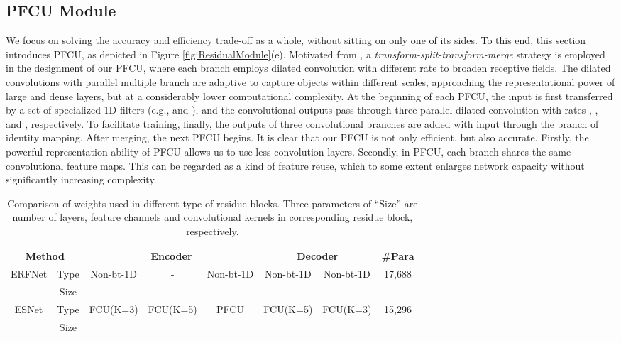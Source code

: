 \documentclass[runningheads]{llncs}
\begin{document}
\subsection{PFCU Module}\label{sec:PFCU}

We focus on solving the accuracy and efficiency trade-off as a whole, without sitting on only one of its sides. To this end, this section introduces PFCU, as depicted in  Figure \ref{fig:ResidualModule}(e). Motivated from \cite{Rastegari2016xnor,Szegedy2016rethinking}, a \emph{transform-split-transform-merge} strategy is employed in the designment of our PFCU, where each branch employs dilated convolution with different rate to broaden receptive fields. The dilated convolutions with parallel multiple branch are adaptive to capture objects within different scales, approaching the representational power of large and dense layers, but at a considerably lower computational complexity. At the beginning of each PFCU, the input is first transferred by a set of specialized 1D filters (e.g.,  and ), and the convolutional outputs pass through three parallel dilated convolution with rates , , and , respectively. To facilitate training, finally, the outputs of three convolutional branches are added with input through the branch of identity mapping. After merging, the next PFCU begins. It is clear that our PFCU is not only efficient, but also accurate. Firstly, the powerful representation ability of PFCU allows us to use less convolution layers. Secondly, in PFCU, each branch shares the same convolutional feature maps. This can be regarded as a kind of feature reuse, which to some extent enlarges network capacity without significantly increasing complexity.

\begin{table}[!t]
\tabcolsep 0.3mm \caption{Comparison of weights used in different type of residue blocks. Three parameters of ``Size'' are number of layers, feature channels and convolutional kernels in corresponding residue block, respectively.}
\begin{center}
\begin{tabular}{|c|c||c|c|c|c|c|c|}
\hline
\multicolumn{2}{|c||}{Method}     & \multicolumn{3}{c|}{Encoder}     & \multicolumn{2}{c|}{Decoder} & \#Para                 \\ \hline \hline
\multirow{2}{*}{ERFNet\cite{Romera2018erfnet}} & Type   & Non-bt-1D & -        & Non-bt-1D & Non-bt-1D     & Non-bt-1D    & \multirow{2}{*}{17,688} \\ \cline{2-7}
                        & Size &    & -        &   &        &       &                        \\ \hline
\multirow{2}{*}{ESNet}   & Type   & FCU(K=3)  & FCU(K=5) & PFCU      & FCU(K=5)      & FCU(K=3)     & \multirow{2}{*}{15,296} \\ \cline{2-7}
                        & Size &    &   &   &        &       &                        \\ \hline
\end{tabular}
\end{center}\label{tab:Complexity}
\end{table}
\end{document}
